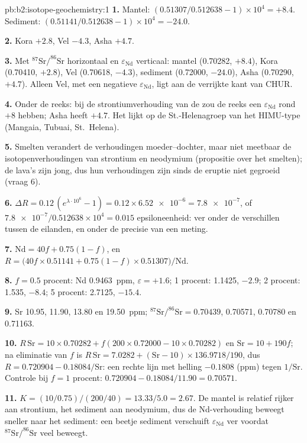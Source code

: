 \begin{solution}{pb:b2:isotope-geochemistry:1}
\textbf{1.} Mantel: $(0.51307/0.512638 - 1)\times10^4 = +8.4$. Sediment:
$(0.51141/0.512638 - 1)\times10^4 = -24.0$.

\textbf{2.} Kora $+2.8$, Vel $-4.3$, Asha $+4.7$.

\textbf{3.} Met $^{87}\mathrm{Sr}/^{86}\mathrm{Sr}$ horizontaal en $\varepsilon_{\mathrm{Nd}}$ verticaal:
mantel (0.70282, $+8.4$), Kora (0.70410, $+2.8$), Vel (0.70618, $-4.3$), sediment
(0.72000, $-24.0$), Asha (0.70290, $+4.7$). Alleen Vel, met een negatieve
$\varepsilon_{\mathrm{Nd}}$, ligt aan de verrijkte kant van CHUR.

\textbf{4.} Onder de reeks: bij de strontiumverhouding van de  zou de reeks
een $\varepsilon_{\mathrm{Nd}}$ rond $+8$ hebben; Asha heeft $+4.7$. Het lijkt op de
St.-Helenagroep van het HIMU-type (Mangaia, Tubuai, St.~Helena).

\textbf{5.} Smelten verandert de verhoudingen moeder--dochter, maar niet meetbaar de
isotopenverhoudingen van strontium en neodymium (propositie over het smelten); de lava's zijn
jong, dus hun verhoudingen zijn sinds de eruptie niet gegroeid (vraag 6).

\textbf{6.} $\Delta R = 0.12\,(e^{\lambda\cdot10^6} - 1) = 0.12\times\num{6.52e-6} =
\num{7.8e-7}$, of $\num{7.8e-7}/0.512638\times10^4 = 0.015$ epsiloneenheid: ver onder de
verschillen tussen de eilanden, en onder de precisie van een meting.

\textbf{7.} $\mathrm{Nd} = 40f + 0.75(1-f)$, en
$R = \bigl(40f\times0.51141 + 0.75(1-f)\times0.51307\bigr)/\mathrm{Nd}$.

\textbf{8.} $f = 0.5$ procent: Nd \qty{0.9463}{ppm}, $\varepsilon = +1.6$; 1 procent:
1.1425, $-2.9$; 2 procent: 1.535, $-8.4$; 5 procent: 2.7125, $-15.4$.

\textbf{9.} Sr 10.95, 11.90, 13.80 en \qty{19.50}{ppm}; $^{87}\mathrm{Sr}/^{86}\mathrm{Sr} =
0.70439$, 0.70571, 0.70780 en 0.71163.

\textbf{10.} $R\,\mathrm{Sr} = 10\times0.70282 + f(200\times0.72000 - 10\times0.70282)$ en
$\mathrm{Sr} = 10 + 190f$; na eliminatie van $f$ is $R\,\mathrm{Sr} = 7.0282 +
(\mathrm{Sr}-10)\times136.9718/190$, dus $R = 0.720904 - 0.18084/\mathrm{Sr}$: een rechte
lijn met helling $-0.1808$ (ppm) tegen $1/\mathrm{Sr}$. Controle bij $f = 1$ procent:
$0.720904 - 0.18084/11.90 = 0.70571$.

\textbf{11.} $K = (10/0.75)/(200/40) = 13.33/5.0 = 2.67$. De mantel is relatief
rijker aan strontium, het sediment aan neodymium, dus de Nd-verhouding beweegt sneller naar het
sediment: een beetje sediment verschuift $\varepsilon_{\mathrm{Nd}}$ ver voordat
$^{87}\mathrm{Sr}/^{86}\mathrm{Sr}$ veel beweegt.


\end{solution}
